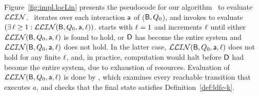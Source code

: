 
Figure~\ref{fig:impl.locLin} presents the pseudocode for our algorithm
\ to evaluate $\mathcal{LLIN}$.
%
\ iterates over each interaction $\mathsf{a}$ of ($\mathsf{B},Q_0$), and 
invokes  to evaluate $(\exists\, \ell \ge 1: \mathcal{LLIN}(\mathsf{B}, Q_0, \mathsf{a}, \ell))$.
starts with $\ell=1$ and increments $\ell$ until either $\mathcal{LLIN}(\mathsf{B}, Q_0, \mathsf{a}, \ell)$ is found to hold, or
$\mathsf{D}$ has become the entire system and $\mathcal{LLIN}(\mathsf{B}, Q_0, \mathsf{a}, \ell)$ does not hold. In the
latter case, $\mathcal{LLIN}(\mathsf{B}, Q_0, \mathsf{a}, \ell)$ does not hold for any finite $\ell$, and, in practice,
computation would halt before $\mathsf{D}$ had become the entire system, due to exhaustion of
resources. Evaluation of $\mathcal{LLIN}(\mathsf{B}, Q_0, \mathsf{a}, \ell)$ is done by 
, which examines every reachable transition
that executes $a$, and checks that the final state satisfies
Definition~\ref{def:ldfc-k}. 

